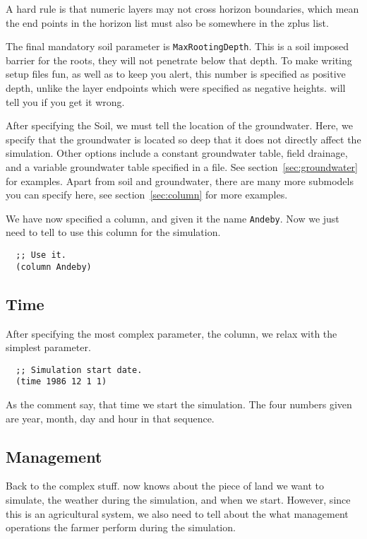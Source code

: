 \documentclass[a4paper,11pt]{article}
\begin{document}
A hard rule is that numeric layers may not cross horizon boundaries,
which mean the end points in the horizon list must also be somewhere
in the zplus list.

The final mandatory soil parameter is \texttt{MaxRootingDepth}.  This
is a soil imposed barrier for the roots, they will not penetrate below
that depth.  To make writing \daisy{} setup files fun, as well as to
keep you alert, this number is specified as positive depth, unlike the
layer endpoints which were specified as negative heights.  \Daisy{}
will tell you if you get it wrong.

After specifying the Soil, we must tell \daisy{} the location of the
groundwater.  Here, we specify that the groundwater is located so deep
that it does not directly affect the simulation.  Other options
include a constant groundwater table, field drainage, and a variable
groundwater table specified in a file.  See
section~\ref{sec:groundwater} for examples.  Apart from soil and
groundwater, there are many more submodels you can specify here,
see section~\ref{sec:column} for more examples.

We have now specified a column, and given it the name \texttt{Andeby}.
Now we just need to tell \daisy{} to use this column for the
simulation.

\begin{verbatim}
  ;; Use it.
  (column Andeby)
\end{verbatim}

\subsection{Time}

After specifying the most complex \daisy{} parameter, the column, we
relax with the simplest parameter.

\begin{verbatim}
  ;; Simulation start date.
  (time 1986 12 1 1)
\end{verbatim}

As the comment say, that time we start the simulation.  The four
numbers given are year, month, day and hour in that sequence.

\subsection{Management}
\label{sec:ex-man}

Back to the complex stuff.  \Daisy{} now knows about the piece of land
we want to simulate, the weather during the simulation, and when we
start.  However, since this is an agricultural system, we also need to
tell \daisy{} about the what management operations the farmer perform
during the simulation.
\end{document}
